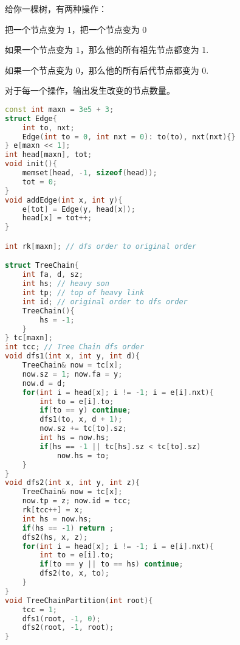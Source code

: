 给你一棵树，有两种操作：

把一个节点变为 1，把一个节点变为 0

如果一个节点变为 1，那么他的所有祖先节点都变为 1.

如果一个节点变为 0，那么他的所有后代节点都变为 0.

对于每一个操作，输出发生改变的节点数量。


\begin{lstlisting}[language=C++]
const int maxn = 3e5 + 3;
struct Edge{
    int to, nxt;
    Edge(int to = 0, int nxt = 0): to(to), nxt(nxt){}
} e[maxn << 1];
int head[maxn], tot;
void init(){
    memset(head, -1, sizeof(head));
    tot = 0;
}
void addEdge(int x, int y){
    e[tot] = Edge(y, head[x]);
    head[x] = tot++;
}

int rk[maxn]; // dfs order to original order

struct TreeChain{
    int fa, d, sz;
    int hs; // heavy son
    int tp; // top of heavy link
    int id; // original order to dfs order
    TreeChain(){
        hs = -1;
    }
} tc[maxn];
int tcc; // Tree Chain dfs order
void dfs1(int x, int y, int d){
    TreeChain& now = tc[x];
    now.sz = 1; now.fa = y;
    now.d = d;
    for(int i = head[x]; i != -1; i = e[i].nxt){
        int to = e[i].to;
        if(to == y) continue;
        dfs1(to, x, d + 1);
        now.sz += tc[to].sz;
        int hs = now.hs;
        if(hs == -1 || tc[hs].sz < tc[to].sz)
            now.hs = to;
    }
}
void dfs2(int x, int y, int z){
    TreeChain& now = tc[x];
    now.tp = z; now.id = tcc;
    rk[tcc++] = x;
    int hs = now.hs;
    if(hs == -1) return ;
    dfs2(hs, x, z);
    for(int i = head[x]; i != -1; i = e[i].nxt){
        int to = e[i].to;
        if(to == y || to == hs) continue;
        dfs2(to, x, to);
    }
}
void TreeChainPartition(int root){
    tcc = 1;
    dfs1(root, -1, 0);
    dfs2(root, -1, root);
}


\end{lstlisting}
